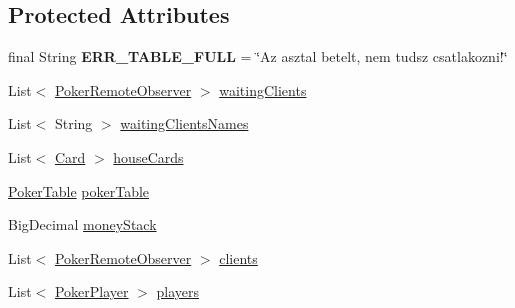 \subsection*{Protected Attributes}
\begin{DoxyCompactItemize}
\item 
\hypertarget{classhu_1_1elte_1_1bfw1p6_1_1poker_1_1server_1_1_abstract_poker_table_server_ad1920b18c6c0bb000dd27d251871e94b}{}final String {\bfseries E\+R\+R\+\_\+\+T\+A\+B\+L\+E\+\_\+\+F\+U\+L\+L} = \char`\"{}Az asztal betelt, nem tudsz csatlakozni!\char`\"{}\label{classhu_1_1elte_1_1bfw1p6_1_1poker_1_1server_1_1_abstract_poker_table_server_ad1920b18c6c0bb000dd27d251871e94b}

\item 
List$<$ \hyperlink{interfacehu_1_1elte_1_1bfw1p6_1_1poker_1_1client_1_1observer_1_1_poker_remote_observer}{Poker\+Remote\+Observer} $>$ \hyperlink{classhu_1_1elte_1_1bfw1p6_1_1poker_1_1server_1_1_abstract_poker_table_server_a4c680fd61c10293c598aee879b2bc085}{waiting\+Clients}
\item 
List$<$ String $>$ \hyperlink{classhu_1_1elte_1_1bfw1p6_1_1poker_1_1server_1_1_abstract_poker_table_server_a6b5046d9bac814a6cc5a39aa4b677df6}{waiting\+Clients\+Names}
\item 
List$<$ \hyperlink{classcom_1_1cantero_1_1games_1_1poker_1_1texasholdem_1_1_card}{Card} $>$ \hyperlink{classhu_1_1elte_1_1bfw1p6_1_1poker_1_1server_1_1_abstract_poker_table_server_a97fa87f3df41cc2ed5c4625ffdb41eb0}{house\+Cards}
\item 
\hyperlink{classhu_1_1elte_1_1bfw1p6_1_1poker_1_1model_1_1entity_1_1_poker_table}{Poker\+Table} \hyperlink{classhu_1_1elte_1_1bfw1p6_1_1poker_1_1server_1_1_abstract_poker_table_server_ac8a64a77bcae91e7824b32911ce76ed4}{poker\+Table}
\item 
Big\+Decimal \hyperlink{classhu_1_1elte_1_1bfw1p6_1_1poker_1_1server_1_1_abstract_poker_table_server_a562c8e757ec0d6093e1bbfce92ef476e}{money\+Stack}
\item 
List$<$ \hyperlink{interfacehu_1_1elte_1_1bfw1p6_1_1poker_1_1client_1_1observer_1_1_poker_remote_observer}{Poker\+Remote\+Observer} $>$ \hyperlink{classhu_1_1elte_1_1bfw1p6_1_1poker_1_1server_1_1_abstract_poker_table_server_a110f50057e2197dcac3a33851f436f59}{clients}
\item 
List$<$ \hyperlink{classhu_1_1elte_1_1bfw1p6_1_1poker_1_1model_1_1entity_1_1_poker_player}{Poker\+Player} $>$ \hyperlink{classhu_1_1elte_1_1bfw1p6_1_1poker_1_1server_1_1_abstract_poker_table_server_af656d24ed8430f64a2977256c117e455}{players}

\end{DoxyCompactItemize}
